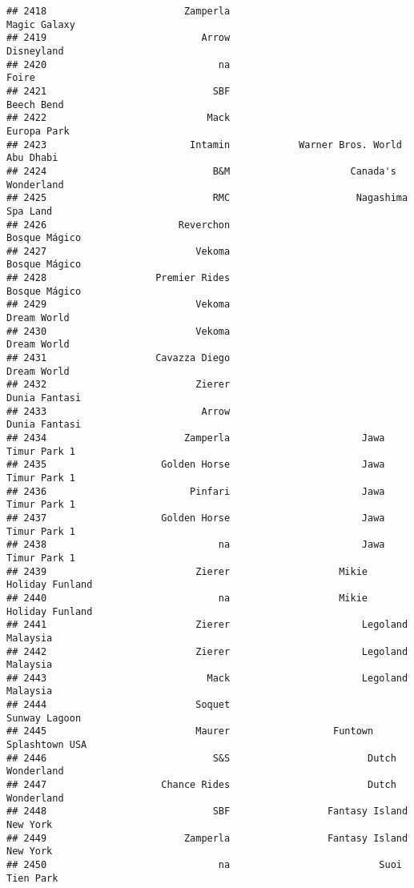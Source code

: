 \documentclass[
]{article}
\begin{document}
\begin{verbatim}
## 2418                        Zamperla                            Magic Galaxy
## 2419                           Arrow                              Disneyland
## 2420                              na                                   Foire
## 2421                             SBF                              Beech Bend
## 2422                            Mack                             Europa Park
## 2423                         Intamin            Warner Bros. World Abu Dhabi
## 2424                             B&M                     Canada's Wonderland
## 2425                             RMC                      Nagashima Spa Land
## 2426                       Reverchon                           Bosque Mágico
## 2427                          Vekoma                           Bosque Mágico
## 2428                   Premier Rides                           Bosque Mágico
## 2429                          Vekoma                             Dream World
## 2430                          Vekoma                             Dream World
## 2431                   Cavazza Diego                             Dream World
## 2432                          Zierer                           Dunia Fantasi
## 2433                           Arrow                           Dunia Fantasi
## 2434                        Zamperla                       Jawa Timur Park 1
## 2435                    Golden Horse                       Jawa Timur Park 1
## 2436                         Pinfari                       Jawa Timur Park 1
## 2437                    Golden Horse                       Jawa Timur Park 1
## 2438                              na                       Jawa Timur Park 1
## 2439                          Zierer                   Mikie Holiday Funland
## 2440                              na                   Mikie Holiday Funland
## 2441                          Zierer                       Legoland Malaysia
## 2442                          Zierer                       Legoland Malaysia
## 2443                            Mack                       Legoland Malaysia
## 2444                          Soquet                           Sunway Lagoon
## 2445                          Maurer                  Funtown Splashtown USA
## 2446                             S&S                        Dutch Wonderland
## 2447                    Chance Rides                        Dutch Wonderland
## 2448                             SBF                 Fantasy Island New York
## 2449                        Zamperla                 Fantasy Island New York
## 2450                              na                          Suoi Tien Park

\end{verbatim}
\end{document}
